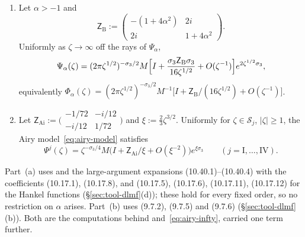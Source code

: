 \begin{lemma}\label{lem:model-corrections}
\begin{enumerate}
\item[(a)] Let $\alpha>-1$ and
  \[
    \mathsf Z_{\mathrm B}:=\begin{pmatrix}-(1+4\alpha^2)&2i\\2i&1+4\alpha^2\end{pmatrix}.
  \]
  Uniformly as $\zeta\to\infty$ off the rays of $\Psi_\alpha$,
  \[
    \Psi_\alpha(\zeta)=(2\pi\zeta^{1/2})^{-\sigma_3/2}M\Bigl[I+\frac{\sigma_3\mathsf Z_{\mathrm B}\sigma_3}{16\zeta^{1/2}}
    +O(\zeta^{-1})\Bigr]e^{2\zeta^{1/2}\sigma_3},
  \]
  equivalently $\Phi_\alpha(\zeta)=(2\pi\zeta^{1/2})^{-\sigma_3/2}M^{-1}\bigl[I+\mathsf Z_{\mathrm B}/(16\zeta^{1/2})+O(\zeta^{-1})\bigr]$.
\item[(b)] Let $\mathsf Z_{\mathrm{Ai}}:=\bigl(\begin{smallmatrix}-1/72&-i/12\\-i/12&1/72\end{smallmatrix}\bigr)$ and
  $\xi:=\frac23\zeta^{3/2}$. Uniformly for $\zeta\in\mathcal S_j$, $|\zeta|\ge1$, the Airy model~\eqref{eq:airy-model} satisfies
  \[
    \Psi^j(\zeta)=\zeta^{-\sigma_3/4}M\bigl(I+\mathsf Z_{\mathrm{Ai}}/\xi+O(\xi^{-2})\bigr)e^{\xi\sigma_3}\qquad(j=\mathrm I,\dots,\mathrm{IV}).
  \]
\end{enumerate}
\end{lemma}

Part~(a) uses \cite[(6.23)--(6.25)]{KMVV} and the large-argument expansions (10.40.1)--(10.40.4) with the coefficients
(10.17.1), (10.17.8), and (10.17.5), (10.17.6), (10.17.11), (10.17.12) for the Hankel functions
(\S\ref{sec:tool-dlmf}(d)); these hold for every fixed order, so no restriction on $\alpha$ arises. Part~(b) uses
(9.7.2), (9.7.5) and (9.7.6) (\S\ref{sec:tool-dlmf}(b)). Both are the computations behind \cite[(6.28)]{KMVV}
and~\eqref{eq:airy-infty}, carried one term further.

